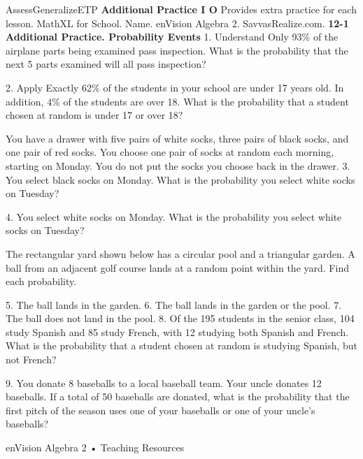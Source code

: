 \documentclass{article}
\newenvironment{te-addendum}[2]{}{}     %
\newcommand{\answer}[1]{}               %
\newcommand{\placeholder}[2]{}          %
\begin{document}
\begin{te-addendum}{Assess}{GeneralizeETP}
\textbf{Additional Practice I O}
Provides extra practice for each lesson. MathXL for School.
Name. enVision Algebra 2. SavvasRealize.com.
\textbf{12-1 Additional Practice. Probability Events}
1. Understand Only 93\% of the airplane parts being examined pass inspection. What is the probability that the next 5 parts examined will all pass inspection?
\answer{about 69.6\%}
2. Apply Exactly 62\% of the students in your school are under 17 years old. In addition, 4\% of the students are over 18. What is the probability that a student chosen at random is under 17 or over 18?
\answer{66\%}
You have a drawer with five pairs of white socks, three pairs of black socks, and one pair of red socks. You choose one pair of socks at random each morning, starting on Monday. You do not put the socks you choose back in the drawer.
3. You select black socks on Monday. What is the probability you select white socks on Tuesday?
\answer{(\frac{5}{8})}
4. You select white socks on Monday. What is the probability you select white socks on Tuesday?
\answer{(\frac{1}{2})}
The rectangular yard shown below has a circular pool and a triangular garden. A ball from an adjacent golf course lands at a random point within the yard. Find each probability.
\placeholder{diagram}{Drawing not to scale. Rectangular yard 100 ft wide, 50 ft high. Circular pool on left radius 12 ft. Shaded right triangle in upper right corner with legs 8 ft across top and 6 ft along right.}
5. The ball lands in the garden. \answer{about 0.005}
6. The ball lands in the garden or the pool. \answer{about 0.095}
7. The ball does not land in the pool. \answer{about 0.91}
8. Of the 195 students in the senior class, 104 study Spanish and 85 study French, with 12 studying both Spanish and French. What is the probability that a student chosen at random is studying Spanish, but not French?
\answer{about 0.47 or 47\%}
9. You donate 8 baseballs to a local baseball team. Your uncle donates 12 baseballs. If a total of 50 baseballs are donated, what is the probability that the first pitch of the season uses one of your baseballs or one of your uncle's baseballs?
\answer{0.4, or 40\%}
enVision Algebra 2 • Teaching Resources
\end{te-addendum}
\end{document}
